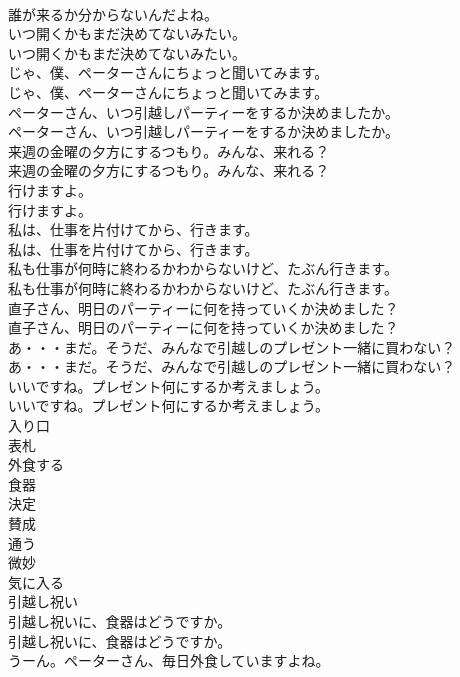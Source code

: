\documentclass[8pt]{extreport}
\begin{document}
\begin{CJK}{UTF8}{min}
\\	誰が来るか分からないんだよね。 
\\	いつ開くかもまだ決めてないみたい。	
\\	いつ開くかもまだ決めてないみたい。 
\\	じゃ、僕、ペーターさんにちょっと聞いてみます。	
\\	じゃ、僕、ペーターさんにちょっと聞いてみます。 
\\	ペーターさん、いつ引越しパーティーをするか決めましたか。	
\\	ペーターさん、いつ引越しパーティーをするか決めましたか。 
\\	来週の金曜の夕方にするつもり。みんな、来れる？	
\\	来週の金曜の夕方にするつもり。みんな、来れる？ 
\\	行けますよ。	
\\	行けますよ。 
\\	私は、仕事を片付けてから、行きます。	
\\	私は、仕事を片付けてから、行きます。 
\\	私も仕事が何時に終わるかわからないけど、たぶん行きます。	
\\	私も仕事が何時に終わるかわからないけど、たぶん行きます。 
\\	直子さん、明日のパーティーに何を持っていくか決めました？	
\\	直子さん、明日のパーティーに何を持っていくか決めました？ 
\\	あ・・・まだ。そうだ、みんなで引越しのプレゼント一緒に買わない？	
\\	あ・・・まだ。そうだ、みんなで引越しのプレゼント一緒に買わない？ 
\\	いいですね。プレゼント何にするか考えましょう。	
\\	いいですね。プレゼント何にするか考えましょう。 
\\	入り口
\\	表札
\\	外食する
\\	食器
\\	決定
\\	賛成
\\	通う
\\	微妙
\\	気に入る
\\	引越し祝い
\\	引越し祝いに、食器はどうですか。	
\\	引越し祝いに、食器はどうですか。 
\\	うーん。ペーターさん、毎日外食していますよね。	

\end{CJK}
\end{document}
